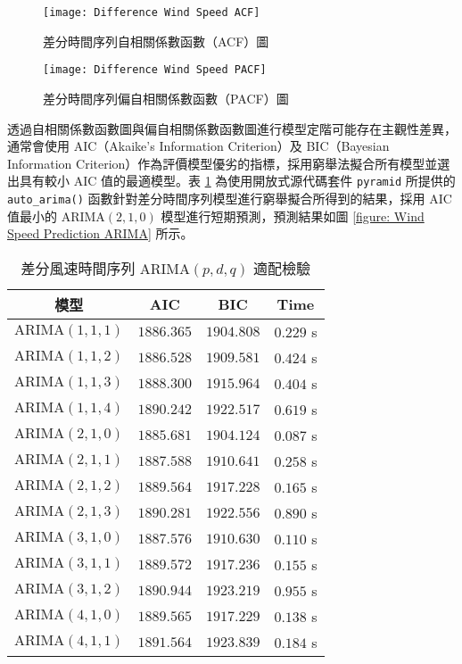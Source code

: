\begin{figure}[htbp]
  \centering
  \texttt{[image: Difference Wind Speed ACF]}
  \caption{差分時間序列自相關係數函數（ACF）圖}
  \label{figure: Difference Wind Speed ACF}
\end{figure}

\begin{figure}[htbp]
  \centering
  \texttt{[image: Difference Wind Speed PACF]}
  \caption{差分時間序列偏自相關係數函數（PACF）圖}
  \label{figure: Difference Wind Speed PACF}
\end{figure}

透過自相關係數函數圖與偏自相關係數函數圖進行模型定階可能存在主觀性差異，通常會使用 AIC（Akaike's Information Criterion）及 BIC（Bayesian Information Criterion）作為評價模型優劣的指標，採用窮舉法擬合所有模型並選出具有較小 AIC 值的最適模型。表 \ref{table: Auto ARIMA Result} 為使用開放式源代碼套件 \texttt{pyramid} 所提供的 \texttt{auto\_arima()} 函數針對差分時間序列模型進行窮舉擬合所得到的結果，採用 AIC 值最小的 $\text{ARIMA} (2, 1, 0)$ 模型進行短期預測，預測結果如圖 \ref{figure: Wind Speed Prediction ARIMA} 所示。

\begin{table}[htbp]
  \centering
  \caption[差分風速時間序列 $\text{ARIMA}(p, d, q)$ 適配檢驗]{差分風速時間序列 $\text{ARIMA}(p, d, q)$ 適配檢驗}
  \begin{tabular}{cccc}
    \toprule
    \textbf{模型} & \textbf{AIC} & \textbf{BIC} & \textbf{Time} \\
    \midrule
    $\text{ARIMA}(1,1,1)$ & $1886.365$ & $1904.808$ & $0.229$ \si{s} \\
    $\text{ARIMA}(1,1,2)$ & $1886.528$ & $1909.581$ & $0.424$ \si{s} \\
    $\text{ARIMA}(1,1,3)$ & $1888.300$ & $1915.964$ & $0.404$ \si{s} \\
    $\text{ARIMA}(1,1,4)$ & $1890.242$ & $1922.517$ & $0.619$ \si{s} \\
    $\text{ARIMA}(2,1,0)$ & $1885.681$ & $1904.124$ & $0.087$ \si{s} \\
    $\text{ARIMA}(2,1,1)$ & $1887.588$ & $1910.641$ & $0.258$ \si{s} \\
    $\text{ARIMA}(2,1,2)$ & $1889.564$ & $1917.228$ & $0.165$ \si{s} \\
    $\text{ARIMA}(2,1,3)$ & $1890.281$ & $1922.556$ & $0.890$ \si{s} \\
    $\text{ARIMA}(3,1,0)$ & $1887.576$ & $1910.630$ & $0.110$ \si{s} \\
    $\text{ARIMA}(3,1,1)$ & $1889.572$ & $1917.236$ & $0.155$ \si{s} \\
    $\text{ARIMA}(3,1,2)$ & $1890.944$ & $1923.219$ & $0.955$ \si{s} \\
    $\text{ARIMA}(4,1,0)$ & $1889.565$ & $1917.229$ & $0.138$ \si{s} \\
    $\text{ARIMA}(4,1,1)$ & $1891.564$ & $1923.839$ & $0.184$ \si{s} \\
    \bottomrule
  \end{tabular}
  \label{table: Auto ARIMA Result}
\end{table}

